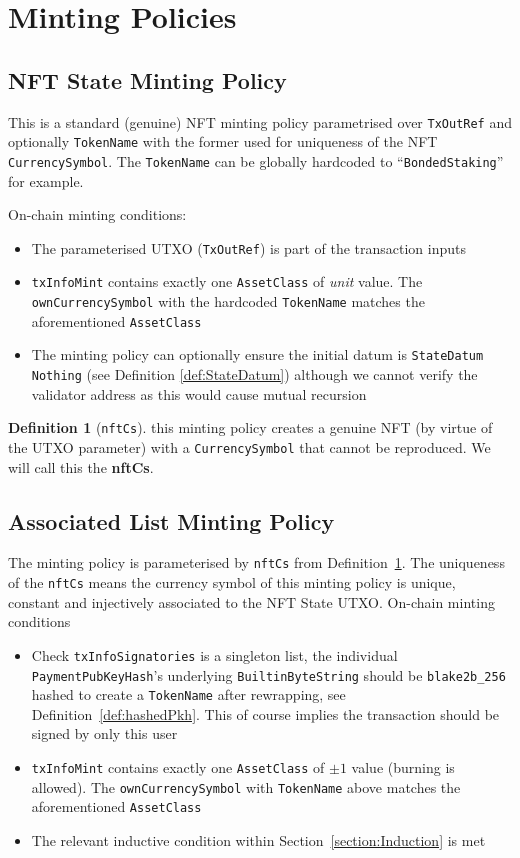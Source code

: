 \documentclass[10pt, a4paper]{article}
\theoremstyle{definition}
\newtheorem{definition}{Definition}[section]
\begin{document}
\section{Minting Policies}\label{section:MintingPolicies}
\subsection{NFT State Minting Policy}\label{subsection:NFTStateMintingPolicy}
This is a standard (genuine) NFT minting policy parametrised over \texttt{TxOutRef} and optionally \texttt{TokenName} with the former used for uniqueness of the NFT \texttt{CurrencySymbol}. The \texttt{TokenName} can be globally hardcoded to ``\texttt{BondedStaking}'' for example.

On-chain minting conditions:
\begin{itemize}
\item{The parameterised UTXO (\texttt{TxOutRef}) is part of the transaction inputs}
\item{\texttt{txInfoMint} contains exactly one \texttt{AssetClass} of \textit{unit} value. The \texttt{ownCurrencySymbol} with the hardcoded \texttt{TokenName} matches the aforementioned \texttt{AssetClass}}
\item{The minting policy can optionally ensure the initial datum is \texttt{StateDatum Nothing} (see Definition \ref{def:StateDatum}) although we cannot verify the validator address as this would cause mutual recursion}
\end{itemize}
\begin{definition}[\texttt{nftCs}]\label{def:nftCs} this minting policy creates a genuine NFT (by virtue of the UTXO parameter) with a \texttt{CurrencySymbol} that cannot be reproduced. We will call this the \textbf{nftCs}.
\end{definition}

\subsection{Associated List Minting Policy}\label{subsection:AssociatedListMintingPolicy}
The minting policy is parameterised by \texttt{nftCs} from Definition~\ref{def:nftCs}. The uniqueness of the \texttt{nftCs} means the currency symbol of this minting policy is unique, constant and injectively associated to the NFT State UTXO.
On-chain minting conditions
\begin{itemize}
\item{Check \texttt{txInfoSignatories} is a singleton list, the individual \texttt{PaymentPubKeyHash}'s underlying \texttt{BuiltinByteString} should be \texttt{blake2b\_256} hashed to create a \texttt{TokenName} after rewrapping, see Definition~\ref{def:hashedPkh}. This of course implies the transaction should be signed by only this user}
\item{\texttt{txInfoMint} contains exactly one \texttt{AssetClass} of $\pm 1$ value (burning is allowed). The \texttt{ownCurrencySymbol} with \texttt{TokenName} above matches the aforementioned \texttt{AssetClass}}
\item{The relevant inductive condition within Section~\ref{section:Induction} is met}
\end{itemize}
\end{document}
